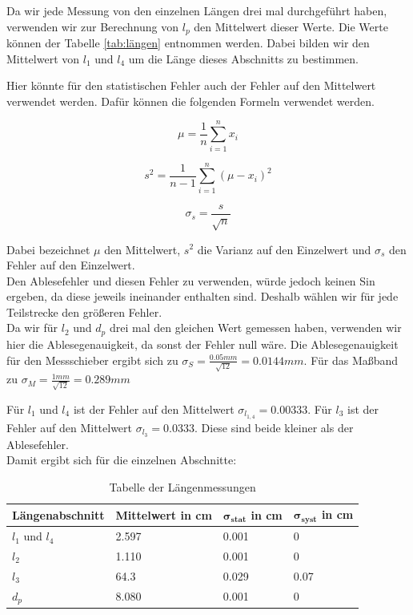 \documentclass[twoside]{protokoll}
\begin{document}
Da wir jede Messung von den einzelnen Längen drei mal durchgeführt haben, verwenden wir zur Berechnung von $l_p$ den Mittelwert dieser Werte. 
Die Werte können der Tabelle \ref{tab:längen} entnommen werden. 
Dabei bilden wir den Mittelwert von $l_1$ und $l_4$ um die Länge dieses Abschnitts zu bestimmen.

Hier könnte für den statistischen Fehler auch der Fehler auf den Mittelwert verwendet werden. 
Dafür können die folgenden Formeln verwendet werden. 

\begin{equation}
	\mu = \frac{1}{n}\sum_{i=1}^nx_i
\end{equation}

\begin{equation}
	s^2 = \frac{1}{n-1}\sum_{i=1}^n(\mu-x_i)^2
\end{equation}

\begin{equation}
	\sigma_s = \frac{s}{\sqrt{n}} 
\end{equation}

Dabei bezeichnet $\mu$ den Mittelwert, $s^2$ die Varianz auf den Einzelwert und $\sigma_s$ den Fehler auf den Einzelwert.\\

Den Ablesefehler und diesen Fehler zu verwenden, würde jedoch keinen Sin ergeben, da diese jeweils ineinander enthalten sind. 
Deshalb wählen wir für jede Teilstrecke den größeren Fehler. \\

Da wir für $l_2$ und $d_p$ drei mal den gleichen Wert gemessen haben, verwenden wir hier die Ablesegenauigkeit, da sonst der Fehler null wäre.
Die Ablesegenauigkeit für den Messschieber ergibt sich zu $\sigma_S = \frac{0.05mm}{\sqrt{12}} = 0.0144mm $. Für das Maßband zu $\sigma_M = \frac{1mm}{\sqrt{12}} = 0.289mm$

Für $l_1$ und $l_4$ ist der Fehler auf den Mittelwert $\sigma_{l_{1,4}} = 0.00333$.
Für $l_3$ ist der Fehler auf den Mittelwert $ \sigma_{l_3} = 0.0333$.
Diese sind beide kleiner als der Ablesefehler.\\

Damit ergibt sich für die einzelnen Abschnitte:

\begin{table}[H]
        \centering
        \begin{tabularx}{1.0\textwidth}{X X X X} %
            \toprule
            \textbf{Längenabschnitt} & \textbf{Mittelwert in cm} & $\mathbf{\sigma_{stat}}$ in cm & $\mathbf{\sigma_{syst}}$ in cm\\
            \midrule
            $l_1$ und $l_4$ & 2.597 & 0.001 & 0 \\
            $l_2$ & 1.110 & 0.001 & 0\\
            $l_3$ & 64.3 & 0.029 & 0.07\\
            $d_p$ & 8.080 & 0.001 & 0\\
            \bottomrule
        \end{tabularx}
        \caption{Tabelle der Längenmessungen}
        \label{tab:längen un fehler}
    \end{table}
\end{document}
